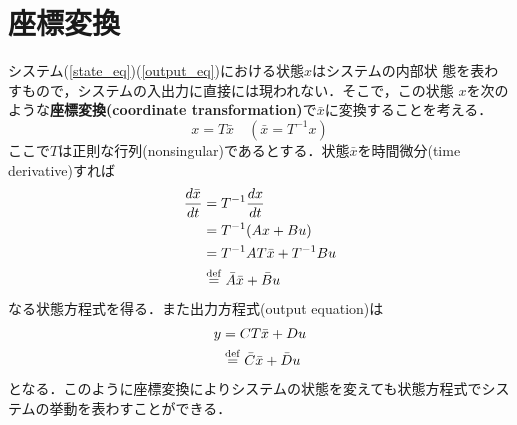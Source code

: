 

\section{座標変換}\label{sec:zahyohenkan}
システム(\ref{state_eq})(\ref{output_eq})における状態$x$はシステムの内部状
態を表わすもので，システムの入出力に直接には現われない．そこで，この状態
$x$を次のような{\bf {座標変換}(coordinate transformation)}で$\bar{x}$に変換することを考える．
\begin{equation}
 x = T \bar{x} \quad (\bar{x} = T^{-1}x)
\end{equation}
ここで$T$は正則な行列(nonsingular)であるとする．状態$\bar{x}$を時間微分(time derivative)すれば
\begin{align}
 \frac{d \bar{x}}{dt} &= T^{-1} \frac{dx}{dt} \nonumber \\
 &= T^{-1} ( A x + B u) \nonumber \\
 &= T^{-1} A T \bar{x} + T^{-1} B u \nonumber \\
 & \stackrel{\rm def}{=} \bar{A} \bar{x} + \bar{B} u
\label{eq:anotherstate_st}
\end{align}
なる状態方程式を得る．また出力方程式(output equation)は
\begin{align}
 y &= C T \bar{x} + D u \nonumber \\
   & \stackrel{\rm def}{=} \bar{C} \bar{x} + \bar{D} u
\label{eq:anotherstate_out}
\end{align}
となる．このように座標変換によりシステムの状態を変えても状態方程式でシス
テムの挙動を表わすことができる．



